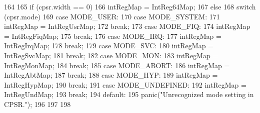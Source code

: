 \begin{DoxyCode}
164         {
165             if (cpsr.width == 0) {
166                 intRegMap = IntReg64Map;
167             } else {
168                 switch (cpsr.mode) {
169                   case MODE_USER:
170                   case MODE_SYSTEM:
171                     intRegMap = IntRegUsrMap;
172                     break;
173                   case MODE_FIQ:
174                     intRegMap = IntRegFiqMap;
175                     break;
176                   case MODE_IRQ:
177                     intRegMap = IntRegIrqMap;
178                     break;
179                   case MODE_SVC:
180                     intRegMap = IntRegSvcMap;
181                     break;
182                   case MODE_MON:
183                     intRegMap = IntRegMonMap;
184                     break;
185                   case MODE_ABORT:
186                     intRegMap = IntRegAbtMap;
187                     break;
188                   case MODE_HYP:
189                     intRegMap = IntRegHypMap;
190                     break;
191                   case MODE_UNDEFINED:
192                     intRegMap = IntRegUndMap;
193                     break;
194                   default:
195                     panic("Unrecognized mode setting in CPSR.\n");
196                 }
197             }
198         }
\end{DoxyCode}


